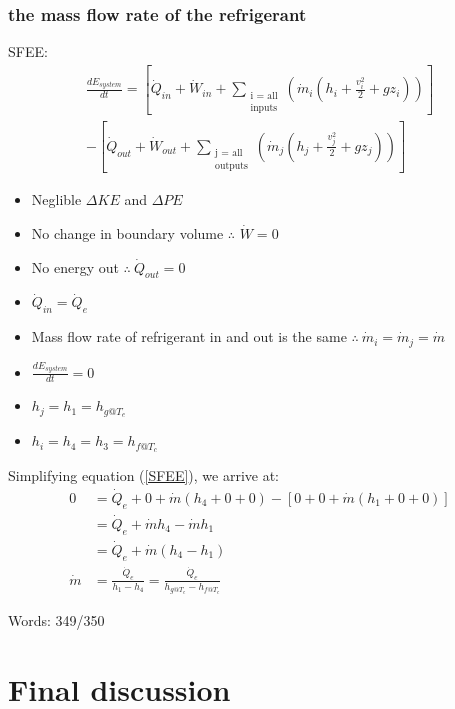 \documentclass[12pt]{article}
\numberwithin{equation}{section}
\begin{document}
\begin{flushleft}
\subsubsection[Refrigerant mass flow rate.]{the mass flow rate of the refrigerant}
SFEE:
\begin{multline}
  \frac{dE_{system}}{dt} = \left[ \dot{Q}_{in} + \dot{W}_{in} + \sum_{\substack{\text{i = all} \\ \text{inputs}}} \left( \dot{m}_i (h_i + \frac{v_i^2}{2} + gz_i) \right) \right] \\ - \left[ \dot{Q}_{out} + \dot{W}_{out} + \sum_{\substack{\text{j = all} \\ \text{outputs}}} \left( \dot{m}_j (h_j + \frac{v_j^2}{2} + gz_j) \right) \right]
  \label{SFEE}
\end{multline}
\begin{itemize}
  \item Neglible $\Delta KE$ and $\Delta PE$
  \item No change in boundary volume $\therefore$ $\dot{W} = 0$
  \item No energy out $\therefore \ \dot{Q}_{out} = 0$
  \item $\dot{Q}_{in} = \dot{Q}_e$
  \item Mass flow rate of refrigerant in and out is the same $\therefore \ \dot{m}_i =\dot{m}_j = \dot{m}$
  \item $\frac{dE_{system}}{dt} = 0$
  \item $h_j = h_1 = h_{g@T_e}$
  \item $h_i = h_4 = h_3 = h_{f@T_c}$
\end{itemize}  
Simplifying equation (\ref{SFEE}), we arrive at:
\begin{align}
  0 &= \dot{Q}_{e} + 0 + \dot{m} (h_4 + 0 + 0) - \left[ 0 + 0 +  \dot{m} (h_1 + 0 + 0) \right]\\
  &= \dot{Q}_{e} + \dot{m} h_4 - \dot{m} h_1\\
  &= \dot{Q}_{e} + \dot{m} (h_4 - h_1)\\
  \dot{m} &= \frac{\dot{Q}_e}{h_1 - h_4} = \frac{\dot{Q}_e}{h_{g@T_e} - h_{f@T_c}}
\end{align}

Words: 349/350
\section{Final discussion}

\end{flushleft}
\end{document}
